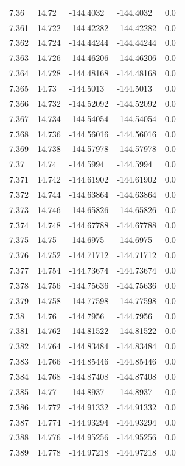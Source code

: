 \begin{tabular}{lllll}
7.36 & 14.72 & -144.4032 & -144.4032 & 0.0 \\
7.361 & 14.722 & -144.42282 & -144.42282 & 0.0 \\
7.362 & 14.724 & -144.44244 & -144.44244 & 0.0 \\
7.363 & 14.726 & -144.46206 & -144.46206 & 0.0 \\
7.364 & 14.728 & -144.48168 & -144.48168 & 0.0 \\
7.365 & 14.73 & -144.5013 & -144.5013 & 0.0 \\
7.366 & 14.732 & -144.52092 & -144.52092 & 0.0 \\
7.367 & 14.734 & -144.54054 & -144.54054 & 0.0 \\
7.368 & 14.736 & -144.56016 & -144.56016 & 0.0 \\
7.369 & 14.738 & -144.57978 & -144.57978 & 0.0 \\
7.37 & 14.74 & -144.5994 & -144.5994 & 0.0 \\
7.371 & 14.742 & -144.61902 & -144.61902 & 0.0 \\
7.372 & 14.744 & -144.63864 & -144.63864 & 0.0 \\
7.373 & 14.746 & -144.65826 & -144.65826 & 0.0 \\
7.374 & 14.748 & -144.67788 & -144.67788 & 0.0 \\
7.375 & 14.75 & -144.6975 & -144.6975 & 0.0 \\
7.376 & 14.752 & -144.71712 & -144.71712 & 0.0 \\
7.377 & 14.754 & -144.73674 & -144.73674 & 0.0 \\
7.378 & 14.756 & -144.75636 & -144.75636 & 0.0 \\
7.379 & 14.758 & -144.77598 & -144.77598 & 0.0 \\
7.38 & 14.76 & -144.7956 & -144.7956 & 0.0 \\
7.381 & 14.762 & -144.81522 & -144.81522 & 0.0 \\
7.382 & 14.764 & -144.83484 & -144.83484 & 0.0 \\
7.383 & 14.766 & -144.85446 & -144.85446 & 0.0 \\
7.384 & 14.768 & -144.87408 & -144.87408 & 0.0 \\
7.385 & 14.77 & -144.8937 & -144.8937 & 0.0 \\
7.386 & 14.772 & -144.91332 & -144.91332 & 0.0 \\
7.387 & 14.774 & -144.93294 & -144.93294 & 0.0 \\
7.388 & 14.776 & -144.95256 & -144.95256 & 0.0 \\
7.389 & 14.778 & -144.97218 & -144.97218 & 0.0 \\

\end{tabular}
